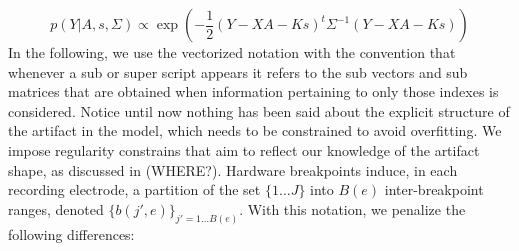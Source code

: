 \documentclass[12pt,letterpaper,fleqn]{article}
\begin{document}
$$p(Y|A,s,\Sigma)\propto \exp\left(-\dfrac{1}{2}(Y-XA-Ks)^t\Sigma^{-1}(Y-XA-Ks)\right)$$
In the following, we use the vectorized notation with the convention that whenever a sub or super script appears it refers to the sub vectors and sub matrices that are obtained when information pertaining to only those indexes is considered. Notice until now nothing has been said about the explicit structure of the artifact in the model, which needs to be constrained to avoid overfitting. We impose regularity constrains that aim to reflect our knowledge of the artifact shape, as discussed in (WHERE?). Hardware breakpoints induce, in each recording electrode, a partition of the set $\{1\ldots J\}$ into $B(e)$ inter-breakpoint ranges, denoted $\{b(j',e)\}_{j'=1\ldots B(e)}$. With this notation, we penalize the following differences:%
\end{document}
